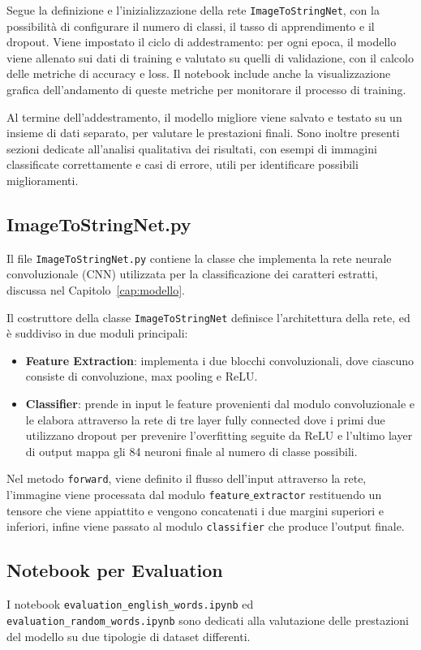 Segue la definizione e l'inizializzazione della rete \texttt{ImageToStringNet}, con la possibilità di configurare il numero di classi, il tasso di apprendimento e il dropout. Viene impostato il ciclo di addestramento: per ogni epoca, il modello viene allenato sui dati di training e valutato su quelli di validazione, con il calcolo delle metriche di accuracy e loss. Il notebook include anche la visualizzazione grafica dell'andamento di queste metriche per monitorare il processo di training.

Al termine dell'addestramento, il modello migliore viene salvato e testato su un insieme di dati separato, per valutare le prestazioni finali. Sono inoltre presenti sezioni dedicate all'analisi qualitativa dei risultati, con esempi di immagini classificate correttamente e casi di errore, utili per identificare possibili miglioramenti.

\subsection{ImageToStringNet.py}
Il file \texttt{ImageToStringNet.py} contiene la classe che implementa la rete neurale convoluzionale (CNN) utilizzata per la classificazione dei caratteri estratti, discussa nel Capitolo~\ref{cap:modello}. 

Il costruttore della classe \texttt{ImageToStringNet} definisce l'architettura della rete, ed è suddiviso in due moduli principali:
\begin{itemize}
    \item \textbf{Feature Extraction}: implementa i due blocchi convoluzionali, dove ciascuno consiste di convoluzione, max pooling e ReLU.
    \item \textbf{Classifier}: prende in input le feature provenienti dal modulo convoluzionale e le elabora attraverso la rete di tre layer fully connected dove i primi due utilizzano dropout per prevenire l'overfitting seguite da ReLU e l'ultimo layer di output mappa gli 84 neuroni finale al numero di classe possibili.
\end{itemize}

Nel metodo \texttt{forward}, viene definito il flusso dell'input attraverso la rete, l'immagine viene processata dal modulo \texttt{feature$\_$extractor} restituendo un tensore che viene appiattito e vengono concatenati i due margini superiori e inferiori, infine viene passato al modulo \texttt{classifier} che produce l'output finale.

\subsection{Notebook per Evaluation}
I notebook \texttt{evaluation\_english\_words.ipynb} ed \\  \texttt{evaluation\_random\_words.ipynb} sono dedicati alla valutazione delle prestazioni del modello su due tipologie di dataset differenti. 

